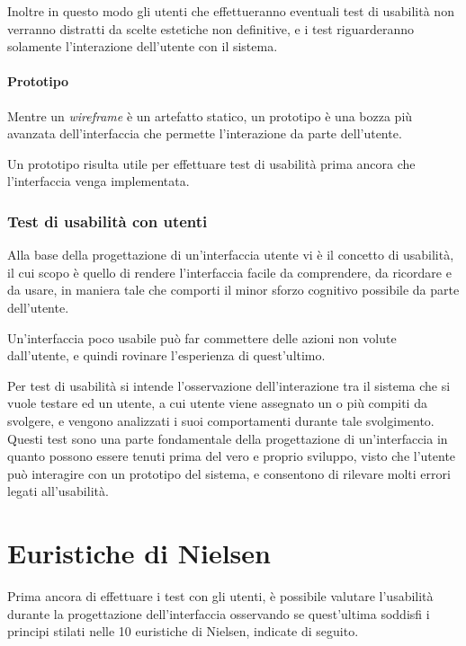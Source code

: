 Inoltre in questo modo gli utenti che effettueranno eventuali test di usabilità non verranno distratti da scelte estetiche non definitive, e i test riguarderanno solamente l'interazione dell'utente con il sistema.

\hypertarget{prototipo}{%
\paragraph{Prototipo}\label{prototipo}}

Mentre un \emph{wireframe} è un artefatto statico, un prototipo è una bozza più avanzata dell'interfaccia che permette l'interazione da parte dell'utente. \cite{differenza-wireframe-prototipo}

Un prototipo risulta utile per effettuare test di usabilità prima ancora che l'interfaccia venga implementata.

\hypertarget{test-di-usabilituxe0-con-utenti}{%
\subsubsection{Test di usabilità con utenti}\label{test-di-usabilituxe0-con-utenti}}

Alla base della progettazione di un'interfaccia utente vi è il concetto di usabilità, il cui scopo è quello di rendere l'interfaccia facile da comprendere, da ricordare e da usare, in maniera tale che comporti il minor sforzo cognitivo possibile da parte dell'utente.

Un'interfaccia poco usabile può far commettere delle azioni non volute dall'utente, e quindi rovinare l'esperienza di quest'ultimo.

Per test di usabilità si intende l'osservazione dell'interazione tra il sistema che si vuole testare ed un utente, a cui utente viene assegnato un o più compiti da svolgere, e vengono analizzati i suoi comportamenti durante tale svolgimento. Questi test sono una parte fondamentale della progettazione di un'interfaccia in quanto possono essere tenuti prima del vero e proprio sviluppo, visto che l'utente può interagire con un prototipo del sistema, e consentono di rilevare molti errori legati all'usabilità. \cite{test-usabilita}

\hypertarget{euristiche-di-nielsen}{%
\section{Euristiche di Nielsen}\label{euristiche-di-nielsen}}

Prima ancora di effettuare i test con gli utenti, è possibile valutare l'usabilità durante la progettazione dell'interfaccia osservando se quest'ultima soddisfi i principi stilati nelle 10 euristiche di Nielsen, indicate di seguito. \cite{euristiche-nielsen}

